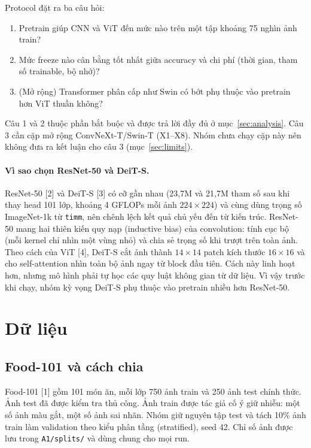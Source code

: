 \documentclass[12pt,a4paper]{article}
\begin{document}
Protocol đặt ra ba câu hỏi:
\begin{enumerate}
\item Pretrain giúp CNN và ViT đến mức nào trên một tập khoảng 75 nghìn ảnh train?
\item Mức freeze nào cân bằng tốt nhất giữa accuracy và chi phí (thời gian, tham số
trainable, bộ nhớ)?
\item (Mở rộng) Transformer phân cấp như Swin có bớt phụ thuộc vào pretrain hơn ViT
thuần không?
\end{enumerate}

Câu 1 và 2 thuộc phần bắt buộc và được trả lời đầy đủ ở mục~\ref{sec:analysis}.
Câu 3 cần cặp mở rộng ConvNeXt-T/Swin-T (X1--X8). Nhóm chưa chạy cặp này nên
không đưa ra kết luận cho câu 3 (mục~\ref{sec:limits}).

\paragraph{Vì sao chọn ResNet-50 và DeiT-S.} ResNet-50 [2] và DeiT-S [3] có cỡ gần nhau (23,7M và
21,7M tham số sau khi thay head 101 lớp, khoảng 4 GFLOPs mỗi ảnh $224\times224$) và
cùng dùng trọng số ImageNet-1k từ \texttt{timm}, nên chênh lệch kết quả chủ yếu đến
từ kiến trúc. ResNet-50 mang hai thiên kiến quy nạp (inductive bias) của
convolution: tính cục bộ (mỗi kernel chỉ nhìn một vùng nhỏ) và chia sẻ trọng số khi
trượt trên toàn ảnh. Theo cách của ViT [4], DeiT-S cắt ảnh thành $14\times14$ patch kích thước $16\times16$ và
cho self-attention nhìn toàn bộ ảnh ngay từ block đầu tiên. Cách này linh hoạt hơn,
nhưng mô hình phải tự học các quy luật không gian từ dữ liệu. Vì vậy trước khi chạy,
nhóm kỳ vọng DeiT-S phụ thuộc vào pretrain nhiều hơn ResNet-50.

\section{Dữ liệu}

\subsection{Food-101 và cách chia}

Food-101 [1] gồm 101 món ăn, mỗi lớp 750 ảnh train và 250 ảnh test chính thức. Ảnh
test đã được kiểm tra thủ công. Ảnh train được tác giả cố ý giữ nhiễu: một số ảnh
màu gắt, một số ảnh sai nhãn. Nhóm giữ nguyên tập test và tách 10\% ảnh train làm
validation theo kiểu phân tầng (stratified), seed 42. Chỉ số ảnh được lưu trong
\texttt{A1/splits/} và dùng chung cho mọi run.
\end{document}
